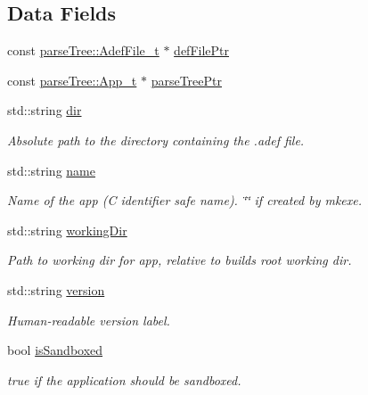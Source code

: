 \subsection*{Data Fields}
\begin{DoxyCompactItemize}
\item 
const \hyperlink{structparse_tree_1_1_adef_file__t}{parse\+Tree\+::\+Adef\+File\+\_\+t} $\ast$ \hyperlink{structmodel_1_1_app__t_a00d570985b816e445ac8084f2d9f3033}{def\+File\+Ptr}
\item 
const \hyperlink{structparse_tree_1_1_app__t}{parse\+Tree\+::\+App\+\_\+t} $\ast$ \hyperlink{structmodel_1_1_app__t_ada7bc07eb497364997aa290c9df2abf0}{parse\+Tree\+Ptr}
\item 
std\+::string \hyperlink{structmodel_1_1_app__t_a10dc084d67f48298b164ba2edfe7f34d}{dir}
\begin{DoxyCompactList}\small\item\em Absolute path to the directory containing the .adef file. \end{DoxyCompactList}\item 
std\+::string \hyperlink{structmodel_1_1_app__t_ab843dea0c06dde36254c5948322d75e9}{name}
\begin{DoxyCompactList}\small\item\em Name of the app (C identifier safe name). \char`\"{}\char`\"{} if created by mkexe. \end{DoxyCompactList}\item 
std\+::string \hyperlink{structmodel_1_1_app__t_a1437ef7791144ca95e5b27a6770911db}{working\+Dir}
\begin{DoxyCompactList}\small\item\em Path to working dir for app, relative to build\textquotesingle{}s root working dir. \end{DoxyCompactList}\item 
std\+::string \hyperlink{structmodel_1_1_app__t_adc39f541349ac8b442cf333042305960}{version}
\begin{DoxyCompactList}\small\item\em Human-\/readable version label. \end{DoxyCompactList}\item 
bool \hyperlink{structmodel_1_1_app__t_aa77e246bf3880fce81456537bb1ff8f5}{is\+Sandboxed}
\begin{DoxyCompactList}\small\item\em true if the application should be sandboxed. \end{DoxyCompactList}\item 

\end{DoxyCompactItemize}
